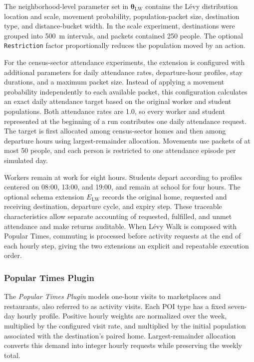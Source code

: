The neighborhood-level parameter set in $\bm{\theta}_{\mathrm{LW}}$ contains the L\'evy distribution location and scale, movement probability, population-packet size, destination type, and distance-bucket width. In the scale experiment, destinations were grouped into 500~m intervals, and packets contained 250 people.
The optional \texttt{Restriction} factor proportionally reduces the population moved by an action.

For the census-sector attendance experiments, the extension is configured with additional parameters for daily attendance rates, departure-hour profiles, stay durations, and a maximum packet size. Instead of applying a movement probability independently to each available packet, this configuration calculates an exact daily attendance target based on the original worker and student populations. Both attendance rates are 1.0, so every worker and student represented at the beginning of a run contributes one daily attendance request. The target is first allocated among census-sector homes and then among departure hours using largest-remainder allocation. Movements use packets of at most 50 people, and each person is restricted to one attendance episode per simulated day.

Workers remain at work for eight hours. Students depart according to profiles centered on 08:00, 13:00, and 19:00, and remain at school for four hours.
The optional schema extension $E_{\mathrm{LW}}$ records the original home, requested and receiving destination, departure cycle, and expiry step. These traceable characteristics allow separate accounting of requested, fulfilled, and unmet attendance and make returns auditable. When L\'evy Walk is composed with Popular Times, commuting is processed before activity requests at the end of each hourly step, giving the two extensions an explicit and repeatable execution order.

\subsubsection{Popular Times Plugin}

The \textit{Popular Times Plugin} models one-hour visits to marketplaces and restaurants, also referred to as activity visits. Each POI type has a fixed seven-day hourly profile. Positive hourly weights are normalized over the week, multiplied by the configured visit rate, and multiplied by the initial population associated with the destination's paired home. Largest-remainder allocation converts this demand into integer hourly requests while preserving the weekly total.

